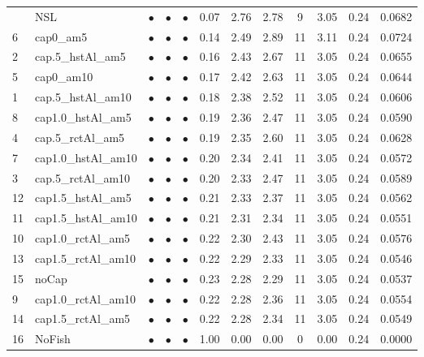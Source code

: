 \documentclass[11pt]{book}
\begin{document}
\begin{landscape}
\begin{longtable}[t]{llcccccccccc}
\midrule
\endhead
\
\endfoot
\bottomrule
\endlastfoot
17 & NSL & $\bullet$ & $\bullet$ & $\bullet$ & 0.07 & 2.76 & 2.78 & 9 & 3.05 & 0.24 & 0.0682\\
6 & cap0\_am5 & $\bullet$ & $\bullet$ & $\bullet$ & 0.14 & 2.49 & 2.89 & 11 & 3.11 & 0.24 & 0.0724\\
2 & cap.5\_hstAl\_am5 & $\bullet$ & $\bullet$ & $\bullet$ & 0.16 & 2.43 & 2.67 & 11 & 3.05 & 0.24 & 0.0655\\
5 & cap0\_am10 & $\bullet$ & $\bullet$ & $\bullet$ & 0.17 & 2.42 & 2.63 & 11 & 3.05 & 0.24 & 0.0644\\
1 & cap.5\_hstAl\_am10 & $\bullet$ & $\bullet$ & $\bullet$ & 0.18 & 2.38 & 2.52 & 11 & 3.05 & 0.24 & 0.0606\\
8 & cap1.0\_hstAl\_am5 & $\bullet$ & $\bullet$ & $\bullet$ & 0.19 & 2.36 & 2.47 & 11 & 3.05 & 0.24 & 0.0590\\
4 & cap.5\_rctAl\_am5 & $\bullet$ & $\bullet$ & $\bullet$ & 0.19 & 2.35 & 2.60 & 11 & 3.05 & 0.24 & 0.0628\\
7 & cap1.0\_hstAl\_am10 & $\bullet$ & $\bullet$ & $\bullet$ & 0.20 & 2.34 & 2.41 & 11 & 3.05 & 0.24 & 0.0572\\
3 & cap.5\_rctAl\_am10 & $\bullet$ & $\bullet$ & $\bullet$ & 0.20 & 2.33 & 2.47 & 11 & 3.05 & 0.24 & 0.0589\\
12 & cap1.5\_hstAl\_am5 & $\bullet$ & $\bullet$ & $\bullet$ & 0.21 & 2.33 & 2.37 & 11 & 3.05 & 0.24 & 0.0562\\
11 & cap1.5\_hstAl\_am10 & $\bullet$ & $\bullet$ & $\bullet$ & 0.21 & 2.31 & 2.34 & 11 & 3.05 & 0.24 & 0.0551\\
10 & cap1.0\_rctAl\_am5 & $\bullet$ & $\bullet$ & $\bullet$ & 0.22 & 2.30 & 2.43 & 11 & 3.05 & 0.24 & 0.0576\\
13 & cap1.5\_rctAl\_am10 & $\bullet$ & $\bullet$ & $\bullet$ & 0.22 & 2.29 & 2.33 & 11 & 3.05 & 0.24 & 0.0546\\
15 & noCap & $\bullet$ & $\bullet$ & $\bullet$ & 0.23 & 2.28 & 2.29 & 11 & 3.05 & 0.24 & 0.0537\\
9 & cap1.0\_rctAl\_am10 & $\bullet$ & $\bullet$ & $\bullet$ & 0.22 & 2.28 & 2.36 & 11 & 3.05 & 0.24 & 0.0554\\
14 & cap1.5\_rctAl\_am5 & $\bullet$ & $\bullet$ & $\bullet$ & 0.22 & 2.28 & 2.34 & 11 & 3.05 & 0.24 & 0.0549\\
16 & NoFish & $\bullet$ & $\bullet$ & $\bullet$ & 1.00 & 0.00 & 0.00 & 0 & 0.00 & 0.24 & 0.0000\\*
\end{longtable}
\end{landscape}
\endgroup{}
\end{document}
